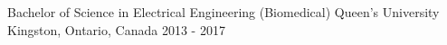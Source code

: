 

\begin{cventries}
  \cventry
    {Bachelor of Science in Electrical Engineering (Biomedical)} %
    {Queen's University} %
    {Kingston, Ontario, Canada} %
    {2013 - 2017} %
{}
\end{cventries}
